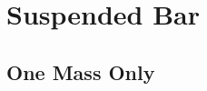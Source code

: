 \documentclass{article}
\begin{document}
\subsection{} %



\subsection{} %




\section{Suspended Bar}

\subsection{One Mass Only}

\subsubsection{} %



\subsubsection{} %



\subsubsection{} %



\subsubsection{} %



\subsubsection{} %



\subsubsection{} %
\end{document}
